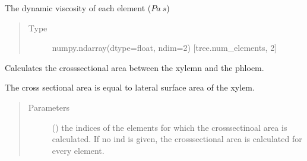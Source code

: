 \documentclass[letterpaper,10pt,english]{sphinxmanual}
\begin{document}
\begin{fulllineitems}
\begin{fulllineitems}
\begin{quote}
\begin{description}
\end{description}\end{quote}

\end{fulllineitems}


\begin{fulllineitems}
\label{\detokenize{index:src.tree.Tree.viscosity}}
The dynamic viscosity of each element
(\(Pa \: s\))
\begin{quote}\begin{description}
\item[{Type}] \leavevmode
numpy.ndarray(dtype=float, ndim=2) {[}tree.num\_elements, 2{]}

\end{description}\end{quote}

\end{fulllineitems}


\begin{fulllineitems}
\label{\detokenize{index:src.tree.Tree.cross_sectional_area}}
Calculates the cross\sphinxhyphen{}sectional area between the xylemn and the phloem.

The cross sectional area is equal to lateral surface area of the xylem.
\begin{quote}\begin{description}
\item[{Parameters}] \leavevmode
{} (\sphinxstyleliteralemphasis{\sphinxupquote{{[}}}\sphinxstyleliteralemphasis{\sphinxupquote{{]} or }}\sphinxstyleliteralemphasis{\sphinxupquote{(}}\sphinxstyleliteralemphasis{\sphinxupquote{, }}\sphinxstyleliteralemphasis{\sphinxupquote{)}}\sphinxstyleliteralemphasis{\sphinxupquote{, }}) \textendash{} the indices of the elements
for which the cross\sphinxhyphen{}sectinoal area is calculated. If no ind is given, the
cross\sphinxhyphen{}sectional area is calculated for every element.


\end{description}
\end{quote}
\end{fulllineitems}
\end{fulllineitems}
\end{document}
